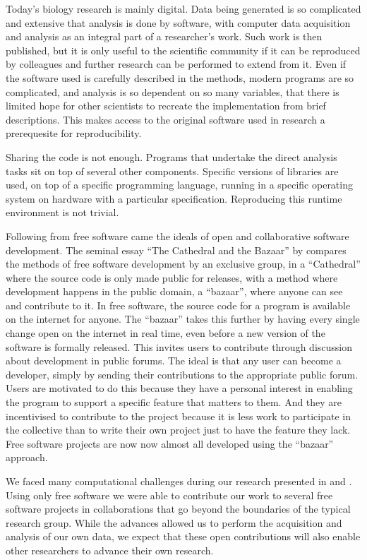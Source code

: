 Today's biology research is mainly digital.  Data being generated is so
complicated and extensive that analysis is done by software, with computer data
acquisition and analysis as an integral part of a researcher's work.
Such work is then published, but it is only useful to the scientific
community if it can be reproduced by colleagues and further
research can be performed to extend from it.  Even if the software used is
carefully described in the methods, modern programs are so
complicated, and analysis is so dependent on so many variables, that
there is limited hope for other scientists to recreate the
implementation from brief descriptions.  This
makes access to the original software used in research a prerequesite for
reproducibility.

Sharing the code is not enough.  Programs that undertake the direct analysis
tasks sit on top of several other components.  Specific versions of
libraries are used, on top of a specific programming language, running
in a specific operating system on hardware with a particular
specification.  Reproducing this runtime environment is not trivial.

Following from free software came the ideals of open and collaborative
software development.  The seminal essay ``The Cathedral and the
Bazaar'' by \citet{raymond1999-cathedral-and-bazaar} compares the
methods of free software development by an exclusive group, in a
``Cathedral'' where the source code is only made public for releases,
with a method where development
happens in the public domain, a ``bazaar'', where anyone can see
and contribute to it.
In free software, the source code for a program is available on the
internet for anyone.  The ``bazaar'' takes this further by having every
single change open on the internet in real time, even before a new version
of the software is formally released.  This invites users to contribute
through discussion about development in public forums.
The ideal is that any user can become a
developer, simply by sending their contributions to the appropriate public
forum.  Users are motivated to do this because they
have a personal interest in enabling the
program to support a specific feature that matters to them.  And they
are incentivised to contribute to the project because it is less work
to participate in the collective
than to write their own project just to have the feature
they lack.
Free software projects \citep{schindelin2012fiji, bioperl} are now
now almost all developed using the ``bazaar'' approach.

We faced many computational challenges
during our research presented in 
and .
Using only free software we were able to contribute our work to several
free software projects in collaborations that go beyond the
boundaries of the typical research group.  While the advances allowed
us to perform the acquisition and analysis of our own data,
we expect that these open contributions
will also enable other researchers to advance their own research.


